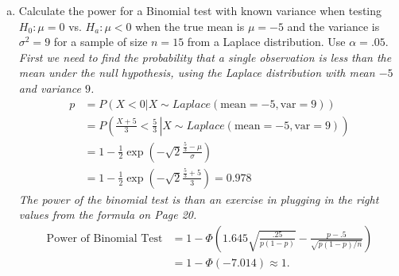 \documentclass[12pt]{article}
\begin{document}
\begin{enumerate}[(a)]
\item Calculate the power for a Binomial test with known variance when testing $H_0: \mu = 0$ vs. $H_a: \mu < 0$ when the true mean is $\mu=−5$ and the variance is $\sigma^2 =9$ for a sample of size $n = 15$ from a Laplace distribution. Use $\alpha = .05$. 
\emph{First we need to find the probability that a single observation is less than the mean under the null hypothesis, using the Laplace distribution with mean $-5$ and variance $9$.}
\begin{align*}
p &= P \left. \left( X < 0 \right| X \sim Laplace(\mbox{mean}=-5, \mbox{var} = 9) \right) \\
&= P \left. \left( \frac{X+5}{3} < \frac{5}{3} \, \right| X \sim Laplace(\mbox{mean}=-5, \mbox{var} = 9) \right) \\
& = 1 - \frac{1}{2} \exp \left( - \sqrt{2} \frac{\frac{5}{3}-\mu} {\sigma} \right) \\
& = 1 - \frac{1}{2} \exp \left( - \sqrt{2} \frac{\frac{5}{3}+5}{3} \right) = 0.978
\end{align*}
\emph{The power of the binomial test is than an exercise in plugging in the right values from the formula on Page 20.}
\begin{align*}
\mbox{Power of Binomial Test} 
& = 1-\Phi \left( 1.645 \sqrt{\frac{.25}{p(1-p)}} - \frac{p-.5}{\sqrt{p(1-p)/n}} \right)\\
& = 1-\Phi \left( -7.014 \right) \approx 1.
\end{align*}


\end{enumerate}
\end{document}
